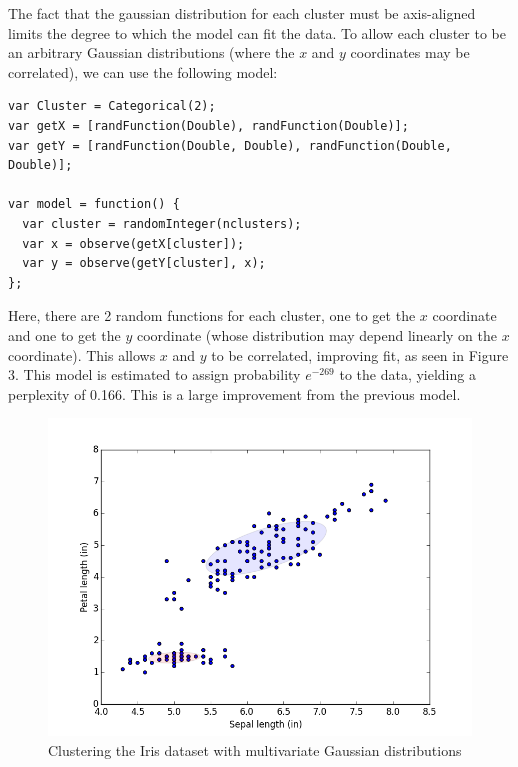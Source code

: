 \documentclass{article}
\begin{document}
  The fact that the gaussian distribution for each cluster must be axis-aligned limits the degree to which the model can fit the data.   To allow each cluster to be an arbitrary Gaussian distributions (where the $x$ and $y$ coordinates may be correlated),
  we can use the following model:

\begin{lstlisting}
var Cluster = Categorical(2);
var getX = [randFunction(Double), randFunction(Double)];
var getY = [randFunction(Double, Double), randFunction(Double, Double)];

var model = function() {
  var cluster = randomInteger(nclusters);
  var x = observe(getX[cluster]);
  var y = observe(getY[cluster], x);
};
\end{lstlisting}

  Here, there are 2 random functions for each cluster, one to get the $x$ coordinate and one to get the $y$ coordinate (whose distribution may depend linearly on the $x$ coordinate).  This allows $x$ and $y$ to be correlated, improving fit, as seen in Figure 3.
  This model is estimated to assign probability $e^{-269}$ to the data, yielding a perplexity of 0.166.  This is a large improvement from the previous model.

  \begin{figure}[h]
  \begin{center}
    \includegraphics[scale=0.5]{../plots/irisclusters_dep.png}
  \end{center}
  \caption{Clustering the Iris dataset with multivariate Gaussian distributions}
\end{figure}
\end{document}
